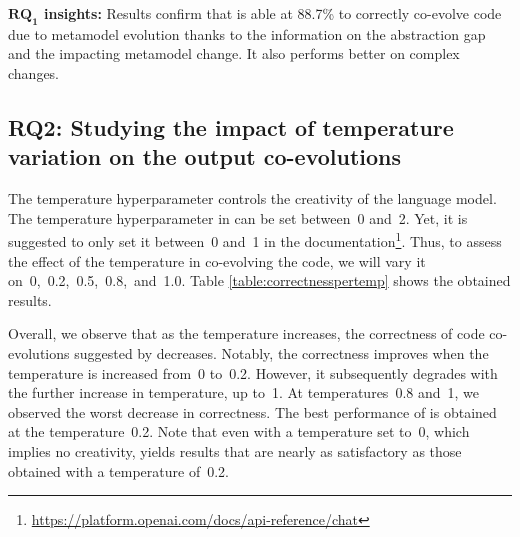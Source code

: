 \begin{tcolorbox}[boxsep=-2pt]
\textbf{$\boldsymbol{RQ_1}$ insights:}
Results confirm that \LLM is able at 88.7\% to correctly co-evolve code due to metamodel evolution thanks to the information on the abstraction gap and the impacting metamodel change. It also performs better on complex changes.  
\end{tcolorbox}


\subsection{RQ2: Studying the impact of temperature variation on the output co-evolutions}

The temperature hyperparameter controls the creativity of the language model. The temperature hyperparameter in \LLM can be set between~0 and~2. Yet, it is suggested to only set it between~0 and~1 in the documentation\footnote{\url{https://platform.openai.com/docs/api-reference/chat}}. Thus, to assess the effect of the temperature in co-evolving the code, we will vary it on~0,~0.2,~0.5,~0.8,~and~1.0. 
Table \ref{table:correctnesspertemp} shows the obtained results. 


Overall, we observe that as the temperature increases, the correctness of code co-evolutions suggested by \LLM decreases. Notably, the correctness improves when the temperature is increased from~0 to~0.2. However, it subsequently degrades with the further increase in temperature, up to~1. At temperatures~0.8 and~1, we observed the worst decrease in correctness. %
The best performance of \LLM is obtained at the temperature~0.2. Note that even with a temperature set to~0, which implies no creativity, \LLM yields results that are nearly as satisfactory as those obtained with a temperature of~0.2.

